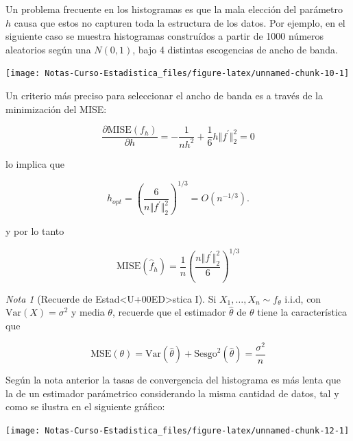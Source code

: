 \documentclass[
  12pt,
]{book}
\theoremstyle{definition}
\theoremstyle{definition}
\theoremstyle{definition}
\theoremstyle{definition}
\theoremstyle{remark}
\newtheorem*{remark}{Nota}
\begin{document}
Un problema frecuente en los histogramas es que la mala elección del parámetro \(h\) causa que estos no capturen toda la estructura de los datos. Por ejemplo, en el siguiente caso se muestra histogramas construídos a partir de 1000 números aleatorios según una \(N(0,1)\), bajo 4 distintas escogencias de ancho de banda.

\begin{center}\texttt{[image: Notas-Curso-Estadistica\_files/figure-latex/unnamed-chunk-10-1]} \end{center}

Un criterio más preciso para seleccionar el ancho de banda es a través de la minimización del MISE:

\begin{equation*}
\frac{\partial \mathrm{MISE}(f_{h})}{\partial h} = -\frac{1}{nh^2} + \frac{1}{6} h \Vert f^\prime\Vert_{2}^2 = 0
\end{equation*}

lo implica que

\begin{equation*}
h_{opt} = \left(\frac{6}{n\Vert f^\prime\Vert_{2}^2}\right) ^{1/3} = O\left( n^{-1/3} \right).
\end{equation*}

y por lo tanto

\begin{equation*}
\mathrm{MISE}(\hat{f}_{h}) = \frac{1}{n} \left(\frac{n\Vert f^\prime\Vert_{2}^2}{6}\right)  ^{1/3}
\end{equation*}

\begin{remark}[Recuerde de Estad<U+00ED>stica I]
Si \(X_1, \ldots, X_n \sim f_{\theta}\) i.i.d, con \(\mathrm{Var}(X) = \sigma^2\) y media \(\theta\), recuerde que el estimador \(\hat{\theta}\) de \(\theta\) tiene la característica que

\begin{equation*}
\mathrm{MSE}(\theta) = \mathrm{Var}(\hat{\theta}) +
\mathrm{Sesgo}^2(\hat{\theta}) = \frac{\sigma^2}{n}
\end{equation*}
\end{remark}

Según la nota anterior la tasas de convergencia del histograma es más lenta que la de un estimador parámetrico considerando la misma cantidad de datos, tal y como se ilustra en el siguiente gráfico:

\begin{center}\texttt{[image: Notas-Curso-Estadistica\_files/figure-latex/unnamed-chunk-12-1]} \end{center}
\end{document}
